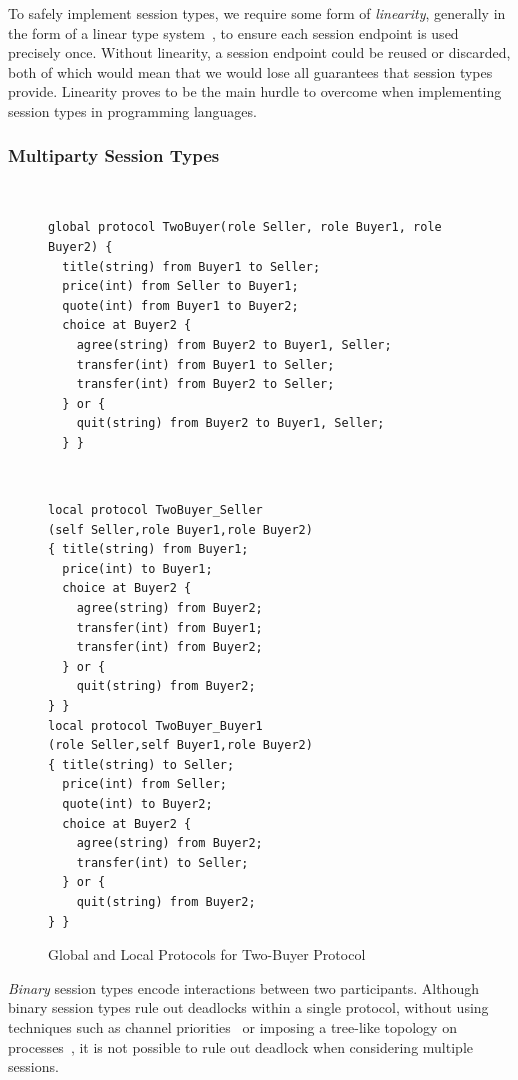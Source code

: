 \documentclass[
graybox,
envcountchap
]{svmult}
\begin{document}
\begin{bibunit}
  To safely implement session types, we require some form of \emph{linearity},
  generally in the form of a linear type system~\cite{Wadler90:linear-types}, to
  ensure each session endpoint is used precisely once. Without linearity, a
  session endpoint could be reused or discarded, both of which would mean that
  we would lose all guarantees that session types provide.
  Linearity proves to be the main hurdle to overcome when implementing session
  types in programming languages.

  \subsubsection{Multiparty Session Types}\label{sec:bt:mpst}

  \begin{figure}
~
\begin{lstlisting}[basicstyle=\scriptsize, language = scribble]
global protocol TwoBuyer(role Seller, role Buyer1, role Buyer2) {
  title(string) from Buyer1 to Seller;
  price(int) from Seller to Buyer1;
  quote(int) from Buyer1 to Buyer2;
  choice at Buyer2 {
    agree(string) from Buyer2 to Buyer1, Seller;
    transfer(int) from Buyer1 to Seller;
    transfer(int) from Buyer2 to Seller;
  } or {
    quit(string) from Buyer2 to Buyer1, Seller;
  } }
\end{lstlisting}%
%
~
\begin{lstlisting}[language = scribble, label={lst:scribble-buy1},multicols=2]
local protocol TwoBuyer_Seller
(self Seller,role Buyer1,role Buyer2)
{ title(string) from Buyer1;
  price(int) to Buyer1;
  choice at Buyer2 {
    agree(string) from Buyer2;
    transfer(int) from Buyer1;
    transfer(int) from Buyer2;
  } or {
    quit(string) from Buyer2;
} }
local protocol TwoBuyer_Buyer1
(role Seller,self Buyer1,role Buyer2)
{ title(string) to Seller;
  price(int) from Seller;
  quote(int) to Buyer2;
  choice at Buyer2 {
    agree(string) from Buyer2;
    transfer(int) to Seller;
  } or {
    quit(string) from Buyer2;
} }
\end{lstlisting}
\caption{Global and Local Protocols for Two-Buyer Protocol}
\label{fig:bt:multiparty}
\end{figure}

\emph{Binary} session types encode interactions between two participants.
Although binary session types rule out deadlocks within a single protocol,
without using techniques such as channel
priorities~\cite{Kobayashi06:df-processes,Padovani14:df-pi,DardhaG18:df-processes}
or imposing a tree-like topology on
processes~\cite{CairesP10:logic,Wadler14:prop-sessions,LindleyM15:semantics}, it
is not possible to rule out deadlock when considering multiple sessions.


\end{bibunit}
\end{document}
